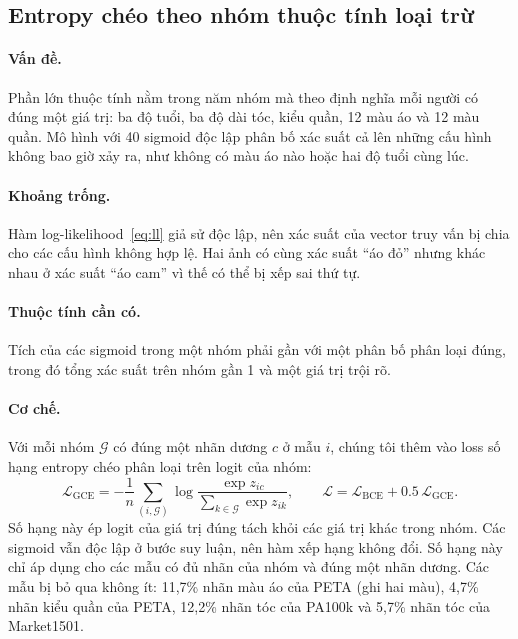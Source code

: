 \documentclass[11pt,a4paper]{article}
\begin{document}
\subsection{Entropy chéo theo nhóm thuộc tính loại trừ}
\label{sec:gce}

\paragraph{Vấn đề.} Phần lớn thuộc tính nằm trong năm nhóm mà theo định nghĩa mỗi người có đúng một giá trị: ba độ tuổi, ba độ dài tóc, kiểu quần, 12 màu áo và 12 màu quần. Mô hình với 40 sigmoid độc lập phân bố xác suất cả lên những cấu hình không bao giờ xảy ra, như không có màu áo nào hoặc hai độ tuổi cùng lúc.

\paragraph{Khoảng trống.} Hàm log-likelihood~\eqref{eq:ll} giả sử độc lập, nên xác suất của vector truy vấn bị chia cho các cấu hình không hợp lệ. Hai ảnh có cùng xác suất ``áo đỏ'' nhưng khác nhau ở xác suất ``áo cam'' vì thế có thể bị xếp sai thứ tự.

\paragraph{Thuộc tính cần có.} Tích của các sigmoid trong một nhóm phải gần với một phân bố phân loại đúng, trong đó tổng xác suất trên nhóm gần 1 và một giá trị trội rõ.

\paragraph{Cơ chế.} Với mỗi nhóm $\mathcal{G}$ có đúng một nhãn dương $c$ ở mẫu $i$, chúng tôi thêm vào loss số hạng entropy chéo phân loại trên logit của nhóm:
\begin{equation}
\mathcal{L}_{\text{GCE}}=-\frac{1}{n}\sum_{(i,\mathcal{G})}\log\frac{\exp z_{ic}}{\sum_{k\in\mathcal{G}}\exp z_{ik}},\qquad \mathcal{L}=\mathcal{L}_{\text{BCE}}+0.5\,\mathcal{L}_{\text{GCE}}.
\end{equation}
Số hạng này ép logit của giá trị đúng tách khỏi các giá trị khác trong nhóm. Các sigmoid vẫn độc lập ở bước suy luận, nên hàm xếp hạng không đổi. Số hạng này chỉ áp dụng cho các mẫu có đủ nhãn của nhóm và đúng một nhãn dương. Các mẫu bị bỏ qua không ít: 11,7\% nhãn màu áo của PETA (ghi hai màu), 4,7\% nhãn kiểu quần của PETA, 12,2\% nhãn tóc của PA100k và 5,7\% nhãn tóc của Market1501.
\end{document}
